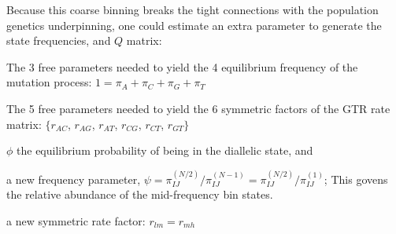 \documentclass{llncs}
\begin{document}
Because this coarse binning breaks the tight connections with the population genetics underpinning, one could estimate an extra parameter to generate the state frequencies, and $Q$ matrix:
\begin{compactitem}
    \item The 3 free parameters needed to yield the 4 equilibrium frequency of the mutation process: $1 = \pi_A + \pi_C + \pi_G + \pi_T$
    \item The 5 free parameters needed to yield the 6 symmetric factors of the GTR rate matrix:  $\{r_{AC}$, $r_{AG}$, $r_{AT}$, $r_{CG}$, $r_{CT}$, $r_{GT}\}$
    \item $\phi$ the equilibrium probability of being in the diallelic state, and
    \item a new frequency parameter, $\psi = \pi_{IJ}^{(N/2)}/\pi_{IJ}^{(N-1)} = \pi_{IJ}^{(N/2)}/\pi_{IJ}^{(1)}$; This govens the relative abundance of the mid-frequency bin states. 
    \item a new symmetric rate factor: $r_{lm} = r_{mh}$
\end{compactitem}
\end{document}
